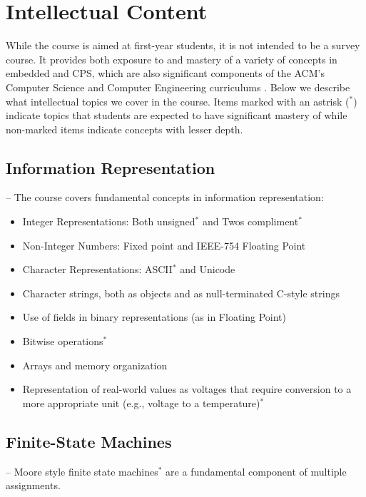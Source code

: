 \section{Intellectual Content}
\label{sec:topics}

While the course is aimed at first-year students, it is not intended to be a survey course.  It provides both exposure to and mastery of a variety of concepts in embedded and CPS, which are also significant components of the ACM's Computer Science and Computer Engineering curriculums \cite{cs13, ce16}.  Below we describe what intellectual topics we cover in the course.  Items marked with an astrisk ($^*$)   indicate topics that students are expected to have significant mastery of while non-marked items indicate concepts with lesser depth.

\subsection{Information Representation} --
\label{sec:ip}
The course covers fundamental concepts in information representation:
\begin{itemize}
  \item Integer Representations: Both unsigned$^*$ and Twos compliment$^*$
  \item Non-Integer Numbers: Fixed point and IEEE-754 Floating Point
  \item Character Representations: ASCII$^*$ and Unicode
  \item Character strings, both as objects and as null-terminated C-style strings
  \item Use of fields in binary representations (as in Floating Point)
  \item Bitwise operations$^*$
  \item Arrays and memory organization
  \item Representation of real-world values as voltages that require conversion to a more appropriate unit (e.g., voltage to a temperature)$^*$
\end{itemize}

\subsection{Finite-State Machines} --
\label{sec:fsm}
Moore style finite state machines$^*$ are a fundamental component of multiple assignments.

